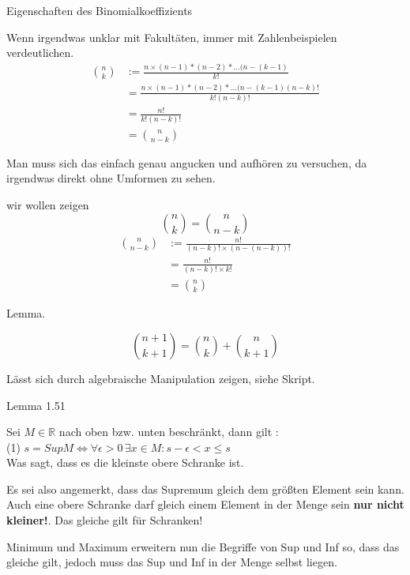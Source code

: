 \documentclass[smallheadings,headsepline,12pt,a4paper]{scrartcl}
\begin{document}
\begin{center}
\item[Eigenschaften des Binomialkoeffizients]
\end{center}
\item Wenn irgendwas unklar mit Fakultäten, immer mit Zahlenbeispielen verdeutlichen.
\begin{equation} 
 \begin{aligned} 
  \binom{n}{k} &:= \frac{n\times (n-1)* (n-2)*...(n-(k-1)}{k!} \\ 
   &= \frac{n\times (n-1)* (n-2)*...(n-(k-1)(n-k)!}{k!(n-k)!} \\
   &= \frac{n!}{k!(n-k)!}  \\
   &= \binom{n}{n-k}
 \end{aligned} 
\end{equation} 
\item Man muss sich das einfach genau angucken und aufhören zu versuchen, da irgendwas direkt ohne Umformen zu sehen.
\item wir wollen zeigen $$ \binom{n}{k} = \binom{n}{n-k} $$
\begin{equation} 
 \begin{aligned} 
  \binom{n}{n-k} &:= \frac{n!}{(n-k)! \times (n-(n-k))!} \\ 
  &= \frac{n!}{(n-k)! \times k!} \\   
   &= \binom{n}{k}
 \end{aligned} 
\end{equation} 

\item Lemma. \\

\item $$ \binom{n+1}{k+1} = \binom{n}{k} + \binom{n}{k+1} $$
\item Lässt sich durch algebraische Manipulation zeigen, siehe Skript.

\begin{center}
\item[Lemma 1.51]
\end{center}
\item Sei $ M \in \mathbb{R} $ nach oben bzw. unten beschränkt, dann gilt :  \\
(1)  $ s = Sup M \Leftrightarrow \forall \epsilon > 0 \, \exists x \in M : s - \epsilon < x \leq s $ \\
Was sagt, dass es die kleinste obere Schranke ist.
\item Es sei also angemerkt, dass das Supremum gleich dem größten Element sein kann. Auch eine obere Schranke darf gleich einem Element in der Menge sein \textbf{nur nicht kleiner!}. Das gleiche gilt für Schranken! 
\item Minimum und Maximum erweitern nun die Begriffe von Sup und Inf so, dass das gleiche gilt, jedoch muss das Sup und Inf in der Menge selbst liegen.
\end{document}
